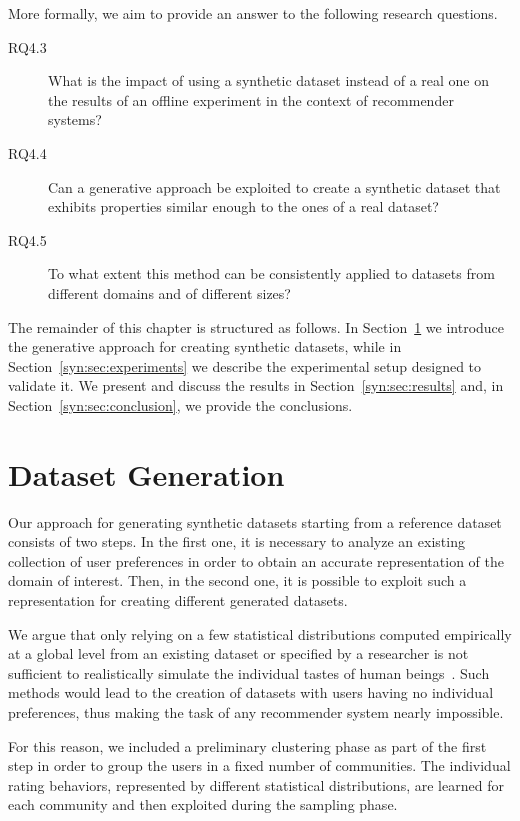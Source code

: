 More formally, we aim to provide an answer to the following research questions.

\begin{description}
\item[RQ4.3\label{syn:itm:rq1}] What is the impact of using a synthetic dataset instead of a real one on the results of an offline experiment in the context of recommender systems?
\item[RQ4.4\label{syn:itm:rq2}] Can a generative approach be exploited to create a synthetic dataset that exhibits properties similar enough to the ones of a real dataset?
\item[RQ4.5\label{syn:itm:rq3}] To what extent this method can be consistently applied to datasets from different domains and of different sizes?
\end{description}

The remainder of this chapter is structured as follows. In Section~\ref{syn:sec:generation} we introduce the generative approach for creating synthetic datasets, while in Section~\ref{syn:sec:experiments} we describe the experimental setup designed to validate it. We present and discuss the results in Section~\ref{syn:sec:results} and, in Section~\ref{syn:sec:conclusion}, we provide the conclusions.

\section{Dataset Generation}
\label{syn:sec:generation}

Our approach for generating synthetic datasets starting from a reference dataset consists of two steps. In the first one, it is necessary to analyze an existing collection of user preferences in order to obtain an accurate representation of the domain of interest. Then, in the second one, it is possible to exploit such a representation for creating different generated datasets.

We argue that only relying on a few statistical distributions computed empirically at a global level from an existing dataset or specified by a researcher is not sufficient to realistically simulate the individual tastes of human beings~\cite{Montaner2004}. Such methods would lead to the creation of datasets with users having no individual preferences, thus making the task of any recommender system nearly impossible.

For this reason, we included a preliminary clustering phase as part of the first step in order to group the users in a fixed number of communities. The individual rating behaviors, represented by different statistical distributions, are learned for each community and then exploited during the sampling phase.

